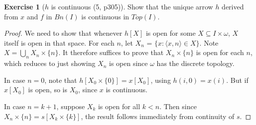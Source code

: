\documentclass{article}
\theoremstyle{definition}
\newtheorem{ex}{Exercise}
\begin{document}
\begin{ex}[$h$ is continuous (5, p305)]

    Show that the unique arrow $h$ derived from $x$ and $f$ in $Bn(I)$ 
    is continuous in $Top(I)$.


\end{ex}
\begin{proof}
    We need to show that whenever $h[X]$ is open for some $X \subseteq I \times \omega$, 
    $X$ itself is open in that space. 
    For each $n$, let $X_n$ = $\{ x : \langle x, n \rangle \in X\}$. 
    Note $X = \bigcup_n X_n \times \{n\}$. It therefore suffices to prove that 
    $X_n \times \{n\}$ is open for each $n$, which reduces to just showing $X_n$ is open
    since $\omega$ has the discrete topology.

    In case $n = 0$, note that $h[X_0 \times \{0\}] = x[X_0]$, using $h(i, 0) = x(i)$.
    But if $x[X_0]$ is open, so is $X_0$, since $x$ is continuous.

    In case $n = k + 1$, suppose $X_k$ is open for all $k < n$. Then since
    $X_{n} \times \{n\} = s[X_k \times \{k\}]$, the result follows immediately from 
    continuity of $s$.
\end{proof}
\end{document}

